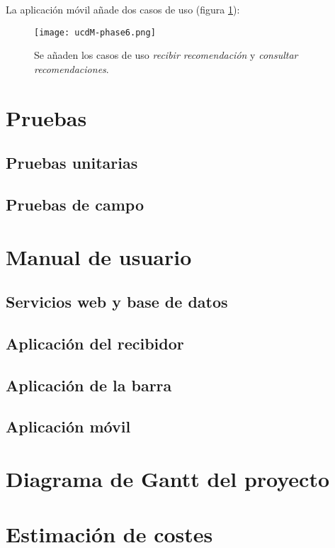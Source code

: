 La aplicación móvil añade dos casos de uso (figura \ref{fig:ucdM-phase6}):

  \begin{figure}[!h]
    \begin{center}
      \texttt{[image: ucdM-phase6.png]}
      \caption{Se añaden los casos de uso \emph{recibir recomendación} y
      \emph{consultar recomendaciones}.}
      \label{fig:ucdM-phase6}
    \end{center}
  \end{figure}

\section{Pruebas}
  \subsection{Pruebas unitarias}
  \subsection{Pruebas de campo}

\section{Manual de usuario}
  \subsection{Servicios web y base de datos}
  \subsection{Aplicación del recibidor}
  \subsection{Aplicación de la barra}
  \subsection{Aplicación móvil}

\section{Diagrama de Gantt del proyecto}

\section{Estimación de costes}


